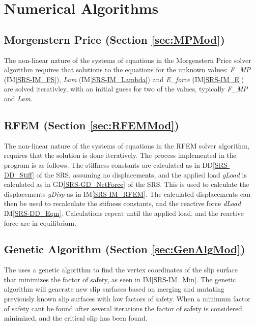 \documentclass[12pt]{article}
\begin{document}

\section{Numerical Algorithms}

\subsection*{Morgenstern Price (Section \ref{sec:MPMod})}
The non-linear nature of the systems of equations in the Morgenstern
Price solver algorithm requires that solutions to the equations for
the unknown values: \textit{F\_MP} (IM\ref{SRS-IM_FS}), \textit{Lam}
(IM\ref{SRS-IM_Lambda}) and \textit{E\_force} (IM\ref{SRS-IM_E}) are
solved iterativley, with an initial guess for two of the values,
typically \textit{F\_MP} and \textit{Lam}.

\subsection*{RFEM (Section \ref{sec:RFEMMod})}
The non-linear nature of the systems of equations in the RFEM solver
algorithm, requires that the solution is done iteratively. The
process implemented in the program is as follows. The stiffness
constants are calculated as in DD\ref{SRS-DD_Stiff} of the SRS,
assuming no displacements, and the applied load \textit{gLoad} is
calculated as in GD\ref{SRS-GD_NetForce} of the SRS. This is used to
calculate the displacements \textit{gDisp} as in
IM\ref{SRS-IM_RFEM}. The calculated displacements can then be used to
recalculate the stifness constants, and the reactive force
\textit{dLoad} IM\ref{SRS-DD_Eqm}. Calculations repeat until the
applied load, and the reactive force are in equilibrium.

\subsection*{Genetic Algorithm (Section \ref{sec:GenAlgMod})}
The uses a genetic algorithm to find the vertex coordinates of the
slip surface that minimizes the factor of safety, as seen in
IM\ref{SRS-IM_Min}. The genetic algorithm will generate new slip
surfaces based on merging and mutating previously known slip surfaces
with low factors of safety. When a minimum factor of safety cant be
found after several iterations the factor of safety is considered
minimized, and the critical slip has been found.
\end{document}
